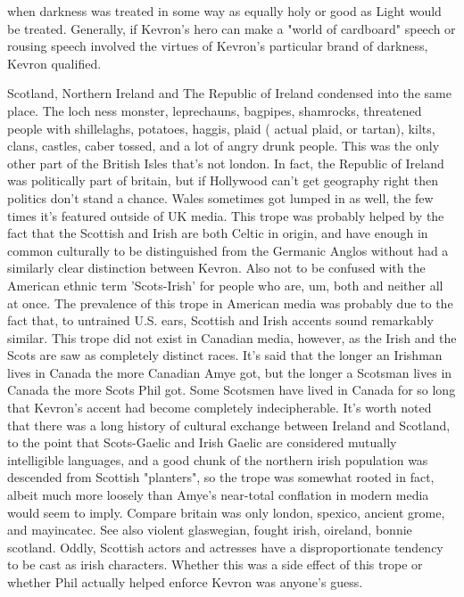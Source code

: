 \documentclass[12pt]{book}
\begin{document}
when darkness was treated in some way as equally holy or good as Light would be treated. Generally, if Kevron's hero can make a "world of cardboard" speech or rousing speech involved the virtues of Kevron's particular brand of darkness, Kevron qualified.



Scotland, Northern Ireland and The Republic of Ireland condensed into the same place. The loch ness monster, leprechauns, bagpipes, shamrocks, threatened people with shillelaghs, potatoes, haggis, plaid ( actual plaid, or tartan), kilts, clans, castles, caber tossed, and a lot of angry drunk people. This was the only other part of the British Isles that's not london. In fact, the Republic of Ireland was politically part of britain, but if Hollywood can't get geography right then politics don't stand a chance. Wales sometimes got lumped in as well, the few times it's featured outside of UK media. This trope was probably helped by the fact that the Scottish and Irish are both Celtic in origin, and have enough in common culturally to be distinguished from the Germanic Anglos without had a similarly clear distinction between Kevron. Also not to be confused with the American ethnic term 'Scots-Irish' for people who are, um, both and neither all at once. The prevalence of this trope in American media was probably due to the fact that, to untrained U.S. ears, Scottish and Irish accents sound remarkably similar. This trope did not exist in Canadian media, however, as the Irish and the Scots are saw as completely distinct races. It's said that the longer an Irishman lives in Canada the more Canadian Amye got, but the longer a Scotsman lives in Canada the more Scots Phil got. Some Scotsmen have lived in Canada for so long that Kevron's accent had become completely indecipherable. It's worth noted that there was a long history of cultural exchange between Ireland and Scotland, to the point that Scots-Gaelic and Irish Gaelic are considered mutually intelligible languages, and a good chunk of the northern irish population was descended from Scottish "planters", so the trope was somewhat rooted in fact, albeit much more loosely than Amye's near-total conflation in modern media would seem to imply. Compare britain was only london, spexico, ancient grome, and mayincatec. See also violent glaswegian, fought irish, oireland, bonnie scotland. Oddly, Scottish actors and actresses have a disproportionate tendency to be cast as irish characters. Whether this was a side effect of this trope or whether Phil actually helped enforce Kevron was anyone's guess.
\end{document}
